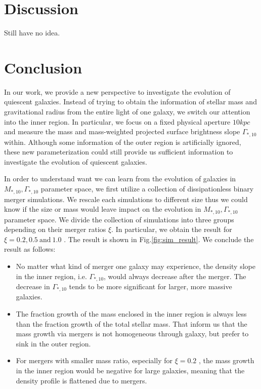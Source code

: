 \documentclass[fleqn,usenatbib]{mnras}
\begin{document}
\section{Discussion}
Still have no idea. 
\section{Conclusion}
In our work, we provide a new perspective to investigate the evolution of quiescent galaxies. Instead of trying to obtain the information of stellar mass and gravitational radius from the entire light of one galaxy, we switch our attention into the inner region. In particular, we focus on a fixed physical aperture $10kpc$ and measure the mass and mass-weighted projected surface brightness slope $\Gamma_{*,10}$ within. Although some information of the outer region is artificially ignored, these new parameterization could still provide us sufficient information to investigate the evolution of quiescent galaxies.
\par In order to understand want we can learn from the evolution of galaxies in $M_{*,10} ,\Gamma_{*,10}$ parameter space, we first utilize a collection of dissipationless binary merger simulations. We rescale each simulations to different size thus we could know if the size or mass would leave impact on the evolution in $M_{*,10} ,\Gamma_{*,10}$ parameter space. We divide the collection of simulations into three groups depending on their merger ratios $\xi$. In particular, we obtain the result for $\xi =  0.2, 0.5 ~\text{and}~ 1.0 $ . The result is shown in Fig.\ref{fig:sim_result}. We conclude the result as follows:
\begin{itemize}
    \item No matter what kind of merger one galaxy may experience, the density slope in the inner region, i.e. $\Gamma_{*,10}$, would always decrease after the merger. The decrease in $\Gamma_{*,10}$ tends to be more significant for larger, more massive galaxies.
    \item The fraction growth of the mass enclosed in the inner region is always less than the fraction growth of the total stellar mass. That inform us that the mass growth via mergers is not homogeneous through galaxy, but prefer to sink in the outer region.
    \item For mergers with smaller mass ratio, especially for $\xi = 0.2$ , the mass growth in the inner region would be negative for large galaxies, meaning that the density profile is flattened due to mergers. 
\end{itemize}
\end{document}
